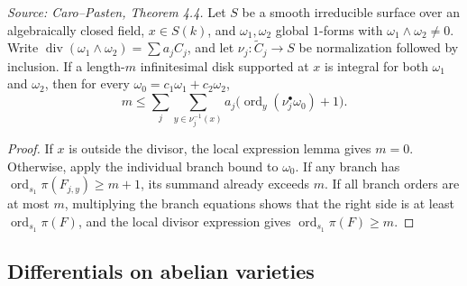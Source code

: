 \begin{theorem}
  \label{thm:cp_overdetermined_bound}
  \textit{Source: Caro--Pasten, Theorem 4.4.}
  Let \(S\) be a smooth irreducible surface over an algebraically closed field,
  \(x\in S(k)\), and \(\omega_1,\omega_2\) global \(1\)-forms with
  \(\omega_1\wedge\omega_2\ne0\).  Write
  \(\operatorname{div}(\omega_1\wedge\omega_2)=\sum a_jC_j\), and let
  \(\nu_j:\widetilde C_j\to S\) be normalization followed by inclusion.  If
  a length-\(m\) infinitesimal disk supported at \(x\) is integral for both
  \(\omega_1\) and \(\omega_2\), then for every
  \(\omega_0=c_1\omega_1+c_2\omega_2\),
  \[
    m\le \sum_j\sum_{y\in\nu_j^{-1}(x)}
      a_j\bigl(\operatorname{ord}_y(\nu_j^\bullet\omega_0)+1\bigr).
  \]
\end{theorem}
\begin{proof}
  If \(x\) is outside the divisor, the local expression lemma gives \(m=0\).
  Otherwise, apply the individual branch bound to \(\omega_0\).  If any branch
  has \(\operatorname{ord}_{s_1}\pi(F_{j,y})\ge m+1\), its summand already
  exceeds \(m\).  If all branch orders are at most \(m\), multiplying the
  branch equations shows that the right side is at least
  \(\operatorname{ord}_{s_1}\pi(F)\), and the local divisor expression gives
  \(\operatorname{ord}_{s_1}\pi(F)\ge m\).
\end{proof}

\subsection{Differentials on abelian varieties}

